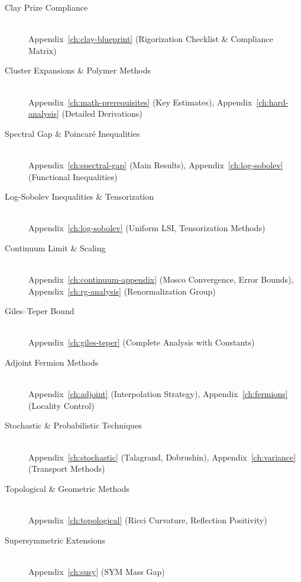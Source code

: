 \documentclass[11pt,a4paper]{report}
\begin{document}
\begin{description}
\item[Clay Prize Compliance] \hfill \\
  Appendix~\ref{ch:clay-blueprint} (Rigorization Checklist \& Compliance Matrix)

\item[Cluster Expansions \& Polymer Methods] \hfill \\
  Appendix~\ref{ch:math-prerequisites} (Key Estimates), 
  Appendix~\ref{ch:hard-analysis} (Detailed Derivations)

\item[Spectral Gap \& Poincar\'e Inequalities] \hfill \\
  Appendix~\ref{ch:spectral-gap} (Main Results),
  Appendix~\ref{ch:log-sobolev} (Functional Inequalities)

\item[Log-Sobolev Inequalities \& Tensorization] \hfill \\
  Appendix~\ref{ch:log-sobolev} (Uniform LSI, Tensorization Methods)

\item[Continuum Limit \& Scaling] \hfill \\
  Appendix~\ref{ch:continuum-appendix} (Mosco Convergence, Error Bounds),
  Appendix~\ref{ch:rg-analysis} (Renormalization Group)

\item[Giles--Teper Bound] \hfill \\
  Appendix~\ref{ch:giles-teper} (Complete Analysis with Constants)

\item[Adjoint Fermion Methods] \hfill \\
  Appendix~\ref{ch:adjoint} (Interpolation Strategy),
  Appendix~\ref{ch:fermions} (Locality Control)

\item[Stochastic \& Probabilistic Techniques] \hfill \\
  Appendix~\ref{ch:stochastic} (Talagrand, Dobrushin),
  Appendix~\ref{ch:variance} (Transport Methods)

\item[Topological \& Geometric Methods] \hfill \\
  Appendix~\ref{ch:topological} (Ricci Curvature, Reflection Positivity)

\item[Supersymmetric Extensions] \hfill \\
  Appendix~\ref{ch:susy} (SYM Mass Gap)


\end{description}
\end{document}

